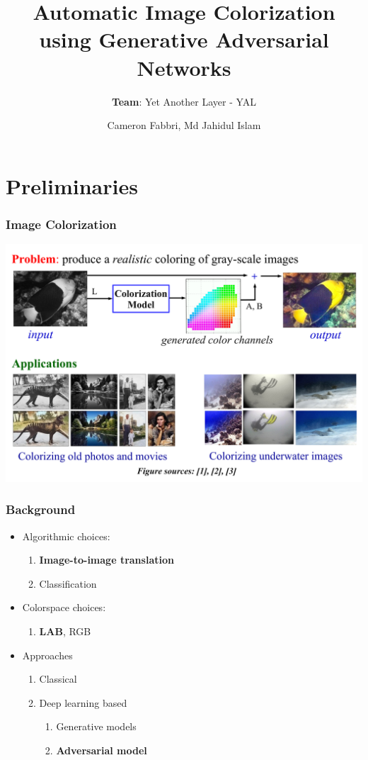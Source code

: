 \documentclass{beamer}
\title{Automatic Image Colorization using Generative Adversarial Networks}
\subtitle{\textbf{Team}: Yet Another Layer - YAL}
\author{Cameron Fabbri, Md Jahidul Islam}
\begin{document}
\date{}
\begin{frame}
\thispagestyle{empty}
\titlepage
\end{frame}

\section*{Preliminaries}
\begin{frame}
\frametitle{\textbf{Image Colorization}}

\includegraphics[width=\linewidth]{6.pdf}



\end{frame}

\begin{frame}
\frametitle{\textbf{Background}}
\begin{itemize}
  \item Algorithmic choices:
	\begin{enumerate}[$-$]
	\item  \textbf{Image-to-image translation} 
	\item Classification
	\end{enumerate}
	
	\item Colorspace choices:
  
	\begin{enumerate}[$-$]
	\item  \textbf{LAB}, RGB
	\end{enumerate}
	
	\item Approaches
  
	\begin{enumerate}[$-$]
	\item Classical
	\item Deep learning based
	\begin{enumerate}[$-$]
	  \item Generative models
	  \item \textbf{Adversarial model}
	\end{enumerate}	 
	\end{enumerate}
	
\end{itemize}
\end{frame}
\end{document}
